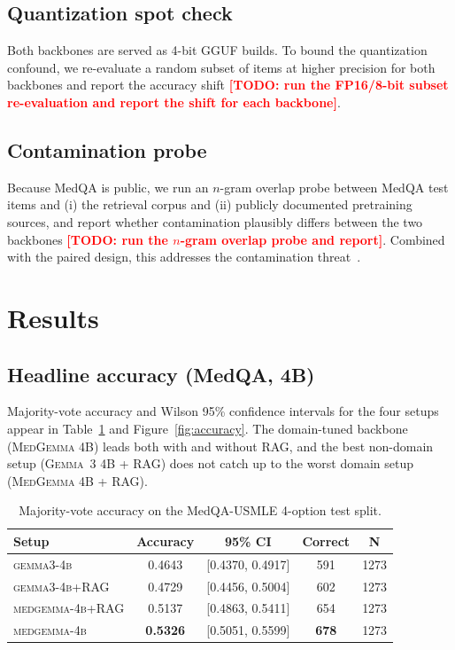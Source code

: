 \documentclass[11pt,a4paper]{article}
\newcommand{\TODO}[1]{\textcolor{red}{\textbf{[TODO: #1]}}}
\begin{document}
\subsection{Quantization spot check}
\label{sec:quant}

Both backbones are served as 4-bit GGUF builds. To bound the quantization
confound, we re-evaluate a random subset of items at higher precision for both
backbones and report the accuracy shift \TODO{run the FP16/8-bit subset
re-evaluation and report the shift for each backbone}.

\subsection{Contamination probe}
\label{sec:contam}

Because MedQA is public, we run an $n$-gram overlap probe between MedQA test
items and (i) the retrieval corpus and (ii) publicly documented pretraining
sources, and report whether contamination plausibly differs between the two
backbones \TODO{run the $n$-gram overlap probe and report}. Combined with the
paired design, this addresses the contamination
threat~\cite{magar2022contamination,sainz2023contamination}.

\section{Results}

\subsection{Headline accuracy (MedQA, 4B)}

Majority-vote accuracy and Wilson 95\% confidence intervals for the
four setups appear in Table~\ref{tab:accuracy} and
Figure~\ref{fig:accuracy}. The domain-tuned backbone (\textsc{MedGemma
4B}) leads both with and without RAG, and the best non-domain setup
(\textsc{Gemma~3 4B + RAG}) does not catch up to the worst domain
setup (\textsc{MedGemma 4B + RAG}).

\begin{table}[h]
\centering
\small
\begin{tabular}{lcccc}
\toprule
\textbf{Setup} & \textbf{Accuracy} & \textbf{95\% CI} & \textbf{Correct} & \textbf{N} \\
\midrule
\textsc{gemma3-4b}        & 0.4643 & [0.4370, 0.4917] & 591 & 1273 \\
\textsc{gemma3-4b+RAG}    & 0.4729 & [0.4456, 0.5004] & 602 & 1273 \\
\textsc{medgemma-4b+RAG}  & 0.5137 & [0.4863, 0.5411] & 654 & 1273 \\
\textsc{medgemma-4b}      & \textbf{0.5326} & [0.5051, 0.5599] & \textbf{678} & 1273 \\
\bottomrule
\end{tabular}
\caption{Majority-vote accuracy on the MedQA-USMLE 4-option test split.}
\label{tab:accuracy}
\end{table}
\end{document}
